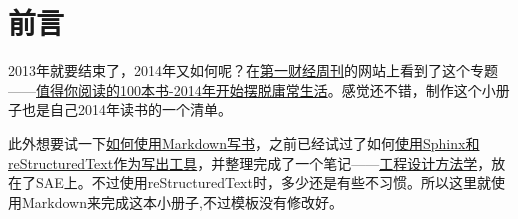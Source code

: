 \section{前言}

2013年就要结束了，2014年又如何呢？在\href{http://www.cbnweek.com/}{第一财经周刊}的网站上看到了这个专题------\href{http://www.cbnweek.com/v/subject?id=22}{值得你阅读的100本书-2014年开始摆脱庸常生活}。感觉还不错，制作这个小册子也是自己2014年读书的一个清单。

此外想要试一下\href{https://github.com/larrycai/kaiyuanbook/blob/master/zh/chapters/01-chapter3.markdown}{如何使用Markdown写书}，之前已经试过了如何\href{http://myshare.dscloud.me/scipydoc/pydoc\_write\_tools.html}{使用Sphinx和reStructuredText作为写出工具}，并整理完成了一个笔记------\href{http://conanxincv.sinaapp.com/project1/index.html}{工程设计方法学}，放在了SAE上。不过使用reStructuredText时，多少还是有些不习惯。所以这里就使用Markdown来完成这本小册子,不过模板没有修改好。
